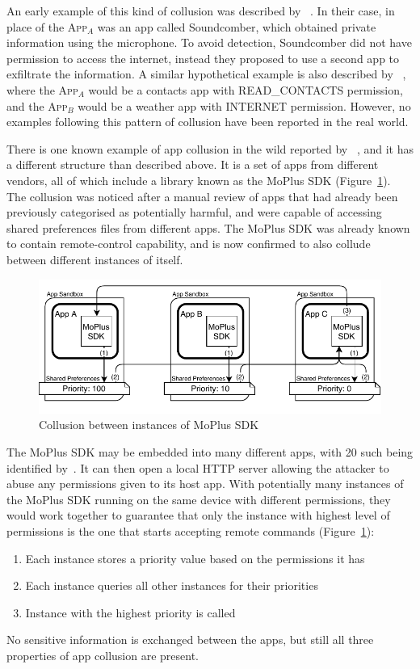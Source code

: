 \documentclass[article, oneside]{aaltoseries}
\newcommand{\Fref}[1]{Figure~\ref{#1}}
\newcommand{\app}[1]{A\textsc{pp}$_{#1}$\xspace}
\begin{document}
An early example of this kind of collusion was described by \citeauthor{Schlegel2011}~\cite{Schlegel2011}. In their case, in place of the \app{A} was an app called Soundcomber, which obtained private information using the microphone. To avoid detection, Soundcomber did not have permission to access the internet, instead they proposed to use a second app to exfiltrate the information. A similar hypothetical example is also described by \citeauthor{Asavoae2017}~\cite{Asavoae2017}, where the \app{A} would be a contacts app with READ\_CONTACTS permission, and the \app{B} would be a weather app with INTERNET permission. However, no examples following this pattern of collusion have been reported in the real world.

There is one known example of app collusion in the wild reported by \citeauthor{Blasco2016}~\cite{Blasco2016}, and it has a different structure than described above. It is a set of apps from different vendors, all of which include a library known as the MoPlus SDK (\Fref{fig:moplus}). The collusion was noticed after a manual review of apps that had already been previously categorised as potentially harmful, and were capable of accessing shared preferences files from different apps. The MoPlus SDK was already known to contain remote-control capability, and is now confirmed to also collude between different instances of itself.

\begin{figure}[h]
	\centering
	\includegraphics[width=1.0\textwidth]{figures/Collusion2}
	\caption{Collusion between instances of MoPlus SDK~\cite{Blasco2016}}
	\label{fig:moplus}
\end{figure}

The MoPlus SDK may be embedded into many different apps, with 20 such being identified by~\cite{Blasco2016}. It can then open a local HTTP server allowing the attacker to abuse any permissions given to its host app. With potentially many instances of the MoPlus SDK running on the same device with different permissions, they would work together to guarantee that only the instance with highest level of permissions is the one that starts accepting remote commands (\Fref{fig:moplus}):
\begin{enumerate}[nosep,label={(\arabic*)}]
	\item Each instance stores a priority value based on the permissions it has
	\item Each instance queries all other instances for their priorities
	\item Instance with the highest priority is called
\end{enumerate}
No sensitive information is exchanged between the apps, but still all three properties of app collusion are present.
\end{document}
